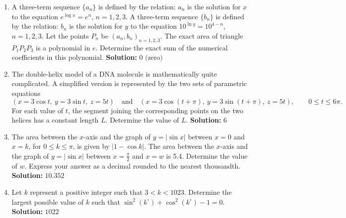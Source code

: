 \documentclass[10pt]{article}
\begin{document}
\begin{enumerate}
\item A three-term sequence $\{a_n\}$ is defined by the relation: $a_n$ is the solution for $x$ to the equation $e^{\log x}=e^n$, $n=1,2,3$. A three-term sequence $\{b_n\}$ is defined by the relation: $b_n$ is the solution for $y$ to the equation $10^{\ln y}=10^{4-n}$, $n=1,2,3$. Let the points $P_n$ be $(a_n,b_n)_{n=1,2,3}$. The exact area of triangle $P_1P_2P_3$ is a polynomial in $e$. Determine the exact sum of the numerical coefficients in this polynomial. \textbf{Solution:} $\boxed{0\text{ (zero)}}$

\item The double-helix model of a DNA molecule is mathematically quite complicated. A simplified version is represented by the two sets of parametric equations
\[
(x=3\cos t,\ y=3\sin t,\ z=5t)
\quad\text{and}\quad
(x=3\cos(t+\pi),\ y=3\sin(t+\pi),\ z=5t),
\qquad 0\le t\le6\pi.
\]
For each value of $t$, the segment joining the corresponding points on the two helices has a constant length $L$. Determine the value of $L$. \textbf{Solution:} $\boxed{6}$

\item The area between the $x$-axis and the graph of $y=|\sin x|$ between $x=0$ and $x=k$, for $0\le k\le\pi$, is given by $|1-\cos k|$. The area between the $x$-axis and the graph of $y=|\sin x|$ between $x=\frac{\pi}{2}$ and $x=w$ is 5.4. Determine the value of $w$. Express your answer as a decimal rounded to the nearest thousandth. \textbf{Solution:} $\boxed{10.352}$

\item Let $k$ represent a positive integer such that $3<k<1023$. Determine the largest possible value of $k$ such that $\sin^2(k^\circ)+\cos^2(k^\circ)-1=0$. \textbf{Solution:} $\boxed{1022}$
\end{enumerate}
\end{document}
